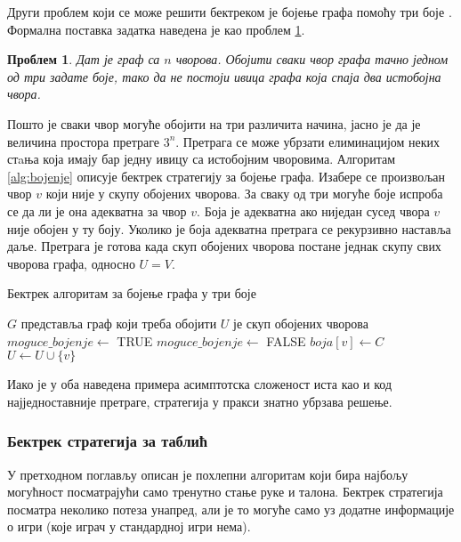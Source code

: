 \documentclass[a4paper, 12pt, ngerman]{article}
\newtheorem{problem}{Проблем}
\begin{document}
Други проблем који се може решити бектреком је бојење графа помоћу три боје \cite{rebnam}. Формална поставка задатка наведена је као проблем \ref{prob:thregraphcolor}.

\begin{problem}
\label{prob:thregraphcolor}
Дат је граф са $n$ чворова. Обојити сваки чвор графа тачно једном од три задате боје, тако да не постоји ивица графа која спаја два истобојна чвора.
\end{problem}

Пошто је сваки чвор могуће обојити на три различита начина, јасно је да је величина простора претраге $3^n$. Претрага се може убрзати елиминацијом неких стaња која имају бар једну ивицу са истобојним чворовима. Алгоритам \ref{alg:bojenje} описује бектрек стратегију за бојење графа. Изабере се произвољан чвор $v$ који није у скупу обојених чворова. За сваку од три могуће боје испроба се да ли је она адекватна за чвор $v$. Боја је адекватна ако ниједан сусед чвора $v$ није обојен у ту боју. Уколико је боја адекватна претрага се рекурзивно наставља даље. Претрага је готова када скуп обојених чворова постане једнак скупу свих чворова графа, односно $U = V$.

\begin{algorithm}[htbp]
	\caption{Бектрек алгоритам за бојење графа у три боје}
	\label{alg:bojenje}
	\begin{algorithmic}
		\Comment $G$ представља граф који треба обојити
		\State\Comment $U$ је скуп обојених чворова
			\State{}
		\EndFor
		\State\Return
		\EndIf
				\Break
			\EndIf
		\EndFor
			\State $moguce\_bojenje \gets$ TRUE
					\State $moguce\_bojenje \gets$ FALSE
					\Break
				\EndIf
			\EndFor
				\State $boja[v] \gets C$
				\State $U \gets U \cup \{v\}$
				\State{}
			\EndIf
		\EndFor
		\EndFunction
	\end{algorithmic}
\end{algorithm}


Иако је у оба наведена примера асимптотска сложеност иста као и код најједноставније претраге, стратегија у пракси знатно убрзава решење.

\subsubsection{Бектрек стратегија за таблић}
У претходном поглављу описан је похлепни алгоритам који бира најбољу могућност посматрајући само тренутно стање руке и талона. Бектрек стратегија посматра неколико потеза унапред, али је то могуће само уз додатне информације о игри (које играч у стандардној игри нема). 
\end{document}
